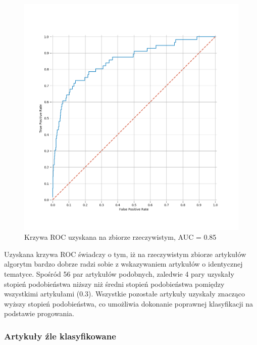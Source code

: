 \begin{figure}[H]
\centering
\includegraphics[width=1.0\textwidth]{./pict/roc_identical.png}
\caption{Krzywa ROC uzyskana na zbiorze rzeczywistym, AUC = 0.85}
\label{fig:actor}
\end{figure}

Uzyskana krzywa ROC świadczy o tym, iż na rzeczywistym zbiorze artykułów algorytm bardzo dobrze radzi sobie z wskazywaniem artykułów o identycznej tematyce. Spośród 56 par artykułów podobnych, zaledwie 4 pary uzyskały stopień podobieństwa niższy niż średni stopień podobieństwa pomiędzy wszystkimi artykułami (0.3). Wszystkie pozostałe artykuły uzyskały znacząco wyższy stopień podobieństwa, co umożliwia dokonanie poprawnej klasyfikacji na podstawie progowania. 

\subsubsection*{Artykuły źle klasyfikowane}

